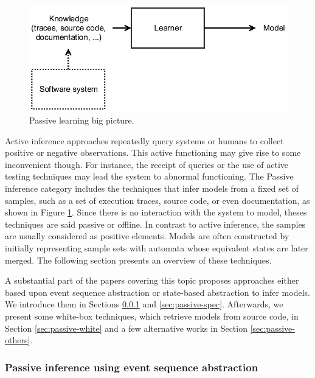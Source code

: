 \begin{figure}[ht]
    \begin{center}
        \includegraphics[width=0.9\linewidth]{figures/passive.png}
    \end{center}

    \caption{Passive learning big picture.}
    \label{fig:passive}
\end{figure}

Active inference approaches repeatedly query systems or humans to
collect positive or negative observations. This active
functioning may give rise to some inconvenient though. For
instance, the receipt of queries or the use of active testing
techniques may lead the system to abnormal functioning. The
Passive inference category includes the techniques that infer
models from a fixed set of samples, such as a set of execution
traces, source code, or even documentation, as shown in Figure
\ref{fig:passive}. Since there is no interaction with the system
to model, theses techniques are said passive or offline. In
contrast to active inference, the samples are usually considered
as  positive elements. Models are often constructed by initially
representing sample sets with automata whose equivalent states
are later merged. The following section presents an overview of
these techniques.

A substantial part of the papers covering this topic proposes
approaches either based upon event sequence abstraction or
state-based abstraction to infer models. We introduce them in
Sections \ref{sec:passive-fsa} and \ref{sec:passive-spec}.
Afterwards, we present some white-box techniques, which retrieve
models from source code, in Section \ref{sec:passive-white} and a
few alternative works in Section \ref{sec:passive-others}.

\subsubsection{Passive inference using event sequence abstraction}
\label{sec:passive-fsa}


